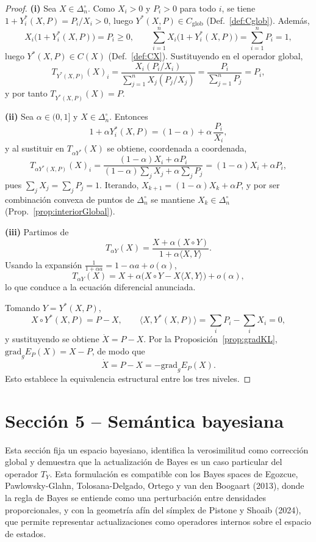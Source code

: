 \documentclass[12pt]{article}
\begin{document}
\begin{proof}
\noindent\textbf{(i)} Sea $X\in\Delta_n^\circ$. Como $X_i>0$ y $P_i>0$ para todo $i$,
se tiene $1+Y^*_i(X,P)=P_i/X_i>0$, luego $Y^*(X,P)\in C_{\mathrm{glob}}$
(Def.~\ref{def:Cglob}). Además,
\[
X_i\bigl(1+Y^*_i(X,P)\bigr)=P_i\ge 0,
\qquad
\sum_{i=1}^n X_i\bigl(1+Y^*_i(X,P)\bigr)=\sum_{i=1}^n P_i=1,
\]
luego $Y^*(X,P)\in C(X)$ (Def.~\ref{def:CX}). Sustituyendo en el operador global,
\[
T_{Y^*(X,P)}(X)_i
=
\frac{X_i(P_i/X_i)}{\sum_{j=1}^n X_j(P_j/X_j)}
=
\frac{P_i}{\sum_{j=1}^n P_j}
=
P_i,
\]
y por tanto $T_{Y^*(X,P)}(X)=P$.

\smallskip
\noindent\textbf{(ii)} Sea $\alpha\in(0,1]$ y $X\in\Delta_n^\circ$. Entonces
\[
1+\alpha Y^*_i(X,P)
=
(1-\alpha)+\alpha\,\frac{P_i}{X_i},
\]
y al sustituir en $T_{\alpha Y^*}(X)$ se obtiene, coordenada a coordenada,
\[
T_{\alpha Y^*(X,P)}(X)_i
=
\frac{(1-\alpha)X_i+\alpha P_i}{(1-\alpha)\sum_{j}X_j+\alpha\sum_{j}P_j}
=
(1-\alpha)X_i+\alpha P_i,
\]
pues $\sum_j X_j=\sum_j P_j=1$. Iterando, $X_{k+1}=(1-\alpha)X_k+\alpha P$, y por
ser combinación convexa de puntos de $\Delta_n^\circ$ se mantiene
$X_k\in\Delta_n^\circ$ (Prop.~\ref{prop:interiorGlobal}).

\smallskip
\noindent\textbf{(iii)} Partimos de
\[
T_{\alpha Y}(X)
=
\frac{X+\alpha(X\circ Y)}{1+\alpha\langle X,Y\rangle}.
\]
Usando la expansión $\frac{1}{1+\alpha a}=1-\alpha a+o(\alpha)$,
\[
T_{\alpha Y}(X)
=
X+\alpha\bigl(X\circ Y-X\langle X,Y\rangle\bigr)+o(\alpha),
\]
lo que conduce a la ecuación diferencial anunciada.

Tomando $Y=Y^*(X,P)$,
\[
X\circ Y^*(X,P)=P-X,
\qquad
\langle X,Y^*(X,P)\rangle=\sum_i P_i-\sum_i X_i=0,
\]
y sustituyendo se obtiene $\dot X=P-X$. Por la
Proposición~\ref{prop:gradKL}, $\mathrm{grad}_g E_P(X)=X-P$, de modo que
\[
\dot X=P-X=-\mathrm{grad}_g E_P(X).
\]
Esto establece la equivalencia estructural entre los tres niveles.
\end{proof}

\clearpage


\section{Sección 5 -- Semántica bayesiana}

Esta sección fija un espacio bayesiano, identifica la verosimilitud como corrección global y demuestra que la actualización de Bayes es un caso particular del operador $T_Y$. Esta formulación es compatible con los Bayes spaces de Egozcue, Pawlowsky-Glahn, Tolosana-Delgado, Ortego y van den Boogaart (2013), donde la regla de Bayes se entiende como una perturbación entre densidades proporcionales, y con la geometría afín del símplex de Pistone y Shoaib (2024), que permite representar actualizaciones como operadores internos sobre el espacio de estados.
\end{document}
